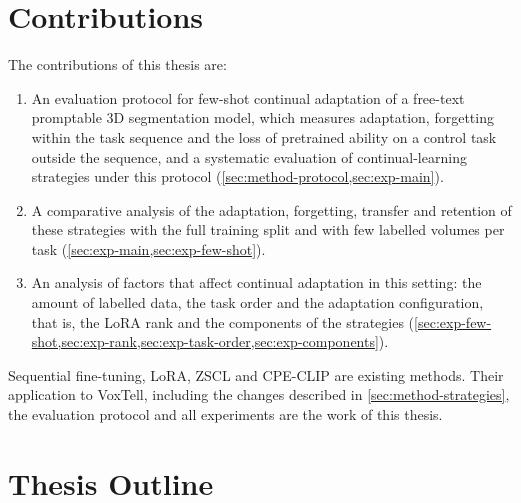 \section{Contributions}
\label{sec:intro-contributions}

The contributions of this thesis are:
\begin{enumerate}
  \item An evaluation protocol for few-shot continual adaptation of a free-text promptable 3D segmentation model, which measures adaptation, forgetting within the task sequence and the loss of pretrained ability on a control task outside the sequence, and a systematic evaluation of continual-learning strategies under this protocol (\cref{sec:method-protocol,sec:exp-main}).
  \item A comparative analysis of the adaptation, forgetting, transfer and retention of these strategies with the full training split and with few labelled volumes per task (\cref{sec:exp-main,sec:exp-few-shot}).
  \item An analysis of factors that affect continual adaptation in this setting: the amount of labelled data, the task order and the adaptation configuration, that is, the LoRA rank and the components of the strategies (\cref{sec:exp-few-shot,sec:exp-rank,sec:exp-task-order,sec:exp-components}).
\end{enumerate}

Sequential fine-tuning, LoRA, ZSCL and CPE-CLIP are existing methods.
Their application to VoxTell, including the changes described in \cref{sec:method-strategies}, the evaluation protocol and all experiments are the work of this thesis.

\section{Thesis Outline}
\label{sec:intro-outline}


